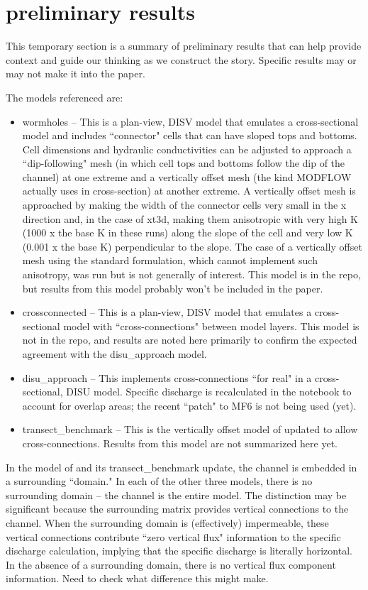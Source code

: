 \documentclass{article}
\begin{document}
\section{preliminary results}
This temporary section is a summary of preliminary results that can help provide context and guide our thinking as we construct the story.  Specific results may or may not make it into the paper.

The models referenced are:
\begin{itemize}
	\item wormholes -- This is a plan-view, DISV model that emulates a cross-sectional model and includes ``connector" cells that can have sloped tops and bottoms. Cell dimensions and hydraulic conductivities can be adjusted to approach a ``dip-following" mesh (in which cell tops and bottoms follow the dip of the channel) at one extreme and a vertically offset mesh (the kind MODFLOW actually uses in cross-section) at another extreme. A vertically offset mesh is approached by making the width of the connector cells very small in the x direction and, in the case of xt3d, making them anisotropic with very high K (1000 x the base K in these runs) along the slope of the cell and very low K (0.001 x the base K) perpendicular to the slope. The case of a vertically offset mesh using the standard formulation, which cannot implement such anisotropy, was run but is not generally of interest. This model is in the repo, but results from this model probably won't be included in the paper.
	\item crossconnected -- This is a plan-view, DISV model that emulates a cross-sectional model with ``cross-connections" between model layers. This model is not in the repo, and results are noted here primarily to confirm the expected agreement with the disu\_approach model.
	\item disu\_approach -- This implements cross-connections ``for real" in a cross-sectional, DISU model. Specific discharge is recalculated in the notebook to account for overlap areas; the recent ``patch" to MF6 is not being used (yet).
	\item transect\_benchmark -- This is the vertically offset model of \cite{bardot2022} updated to allow cross-connections. Results from this model are not summarized here yet.
\end{itemize}

In the model of \cite{bardot2022} and its transect\_benchmark update, the channel is embedded in a surrounding ``domain."  In each of the other three models, there is no surrounding domain -- the channel is the entire model. The distinction may be significant because the surrounding matrix provides vertical connections to the channel. When the surrounding domain is (effectively) impermeable, these vertical connections contribute ``zero vertical flux" information to the specific discharge calculation, implying that the specific discharge is literally horizontal. In the absence of a surrounding domain, there is no vertical flux component information. Need to check what difference this might make.
\end{document}
